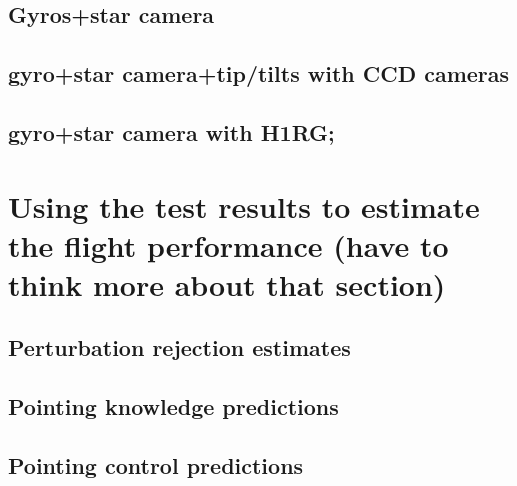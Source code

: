 \subsection{	Gyros+star camera}
\subsection{	gyro+star camera+tip/tilts with CCD cameras}
\subsection{	gyro+star camera with H1RG;}
\section{	Using the test results to estimate the flight performance (have to think more about that section)}
\subsection{	Perturbation rejection estimates}
\subsection{	Pointing knowledge predictions}
\subsection{	Pointing control predictions}
